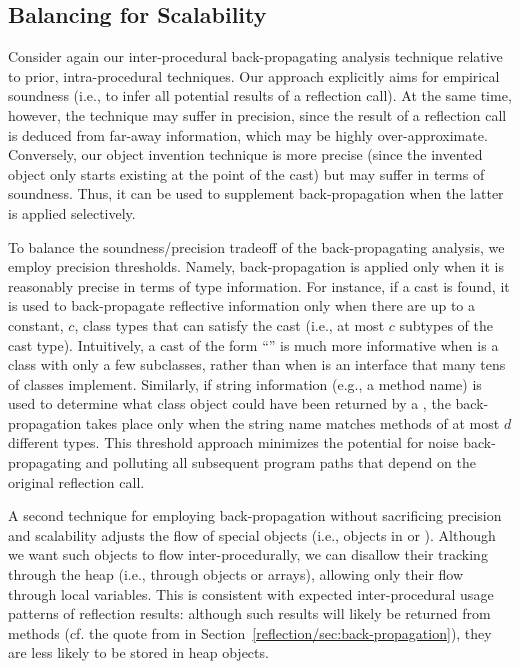 \subsection{Balancing for Scalability}
\label{reflection/sec:throttling}

Consider again our inter-procedural back-propagating analysis
technique relative to prior, intra-procedural techniques. Our approach
explicitly aims for empirical soundness (i.e., to infer all potential
results of a reflection call). At the same time, however, the
technique may suffer in precision, since the result of a reflection
call is deduced from far-away information, which may be highly
over-approximate. Conversely, our object invention technique is more
precise (since the invented object only starts existing at the point
of the cast) but may suffer in terms of soundness. Thus, it can be
used to supplement back-propagation when the latter is applied
selectively.

To balance the soundness/precision tradeoff of the back-propagating
analysis, we employ precision thresholds. Namely, back-propagation is
applied only when it is reasonably precise in terms of type
information. For instance, if a cast is found, it is used to
back-propagate reflective information only when there are up to a
constant, $c$, class types that can satisfy the cast (i.e., at most
$c$ subtypes of the cast type). Intuitively, a cast of the form
``'' is much more informative when  is a
class with only a few subclasses, rather than when  is an
interface that many tens of classes implement. Similarly, if string
information (e.g., a method name) is used to determine what class
object could have been returned by a ,
the back-propagation takes place only when the string name matches
methods of at most $d$ different types. This threshold approach
minimizes the potential for noise back-propagating and polluting all
subsequent program paths that depend on the original reflection call.

A second technique for employing back-propagation without sacrificing
precision and scalability adjusts the flow of special objects (i.e.,
objects in  or
). Although we want such objects
to flow inter-procedurally, we can disallow their tracking through the
heap (i.e., through objects or arrays), allowing only their flow
through local variables. This is consistent with expected
inter-procedural usage patterns of reflection results: although such
results will likely be returned from methods (cf. the quote from
\cite{aplas/LivshitsWL05} in Section~\ref{reflection/sec:back-propagation}),
they are less likely to be stored in heap objects. 

